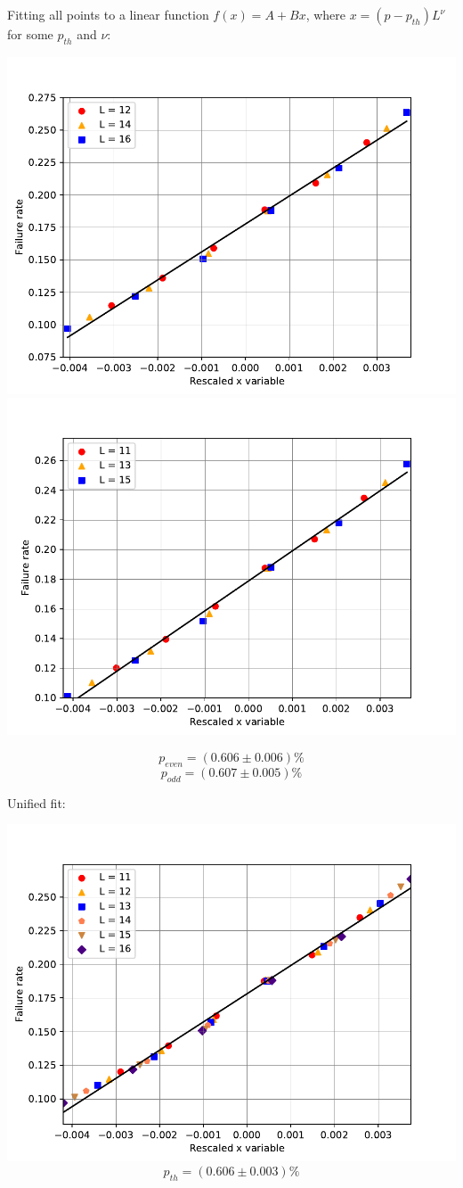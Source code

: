 \documentclass[pra]{revtex4-1}
\begin{document}
\noindent Fitting all points to a linear function $f(x) = A + Bx$, where $x=(p-p_{th})L^{\nu}$ for some $p_{th}$ and $\nu$: 
  
\includegraphics[width=.49\textwidth]{../graphs-paper2/qtz-x-dephasing-even-rescaled.pdf}
\includegraphics[width=.49\textwidth]{../graphs-paper2/qtz-x-dephasing-odd-rescaled.pdf}

\[  p_{even} = (0.606 \pm 0.006)\% \]
\[  p_{odd} = (0.607 \pm 0.005)\% \]
\clearpage 

Unified fit: \begin{center} 

\includegraphics[width=.9\textwidth]{../graphs-paper2/qtz-x-dephasing-rescaled.pdf}
\[  p_{th} = (0.606 \pm 0.003)\% \] \end{center}
\clearpage 
\end{document}
